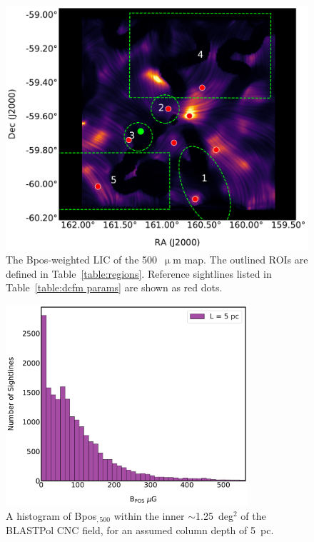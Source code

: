 \begin{figure}[!htbp]
\centering
\includegraphics[width=\textwidth]{figures/carina/B_lic_500_5p0pc}
\caption[~The  weighted LIC of the  map.]{The \gls{Bpos}-weighted LIC of the 500~$\upmu$m map. The outlined ROIs are defined in Table~\ref{table:regions}. Reference sightlines listed in Table~\ref{table:dcfm params} are shown as red dots.}
\label{fig:Bpos_LIC}
\end{figure}

\begin{figure}[!htbp]
\centering
\includegraphics[width=0.8\textwidth]{figures/carina/B_hist_500}
\caption[~A histogram of  over the inner regions of the CNC.]{A histogram of \gls{Bpos}$_{,500}$ within the inner $\sim$1.25~deg$^{2}$ of the BLASTPol CNC field, for an assumed column depth of 5~pc.}
\label{fig:Bpos_hist}
\end{figure}

